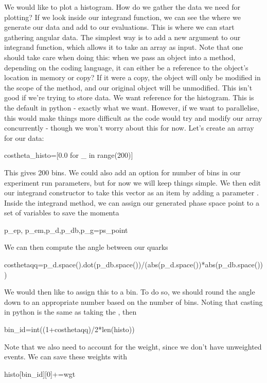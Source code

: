 We would like to plot a histogram. How do we gather the data we need for plotting? If we look inside our integrand function, we can see the where we generate our data and add to our evaluations. This is where we can start gathering angular data. The simplest way is to add a new argument to our integrand function, which allows it to take an array as input. Note that one should take care when doing this: when we pass an object into a method, depending on the coding language, it can either be a reference to the object's location in memory or copy? If it were a copy, the object will only be modified in the scope of the method, and our original object will be unmodified. This isn't good if we're trying to store data. We want reference for the histogram. This is the default in python - exactly what we want. However, if we want to parallelise, this would make things more difficult as the code would try and modify our array concurrently - though we won't worry about this for now. Let's create an array for our data:
\begin{codeenv}
       costheta_histo=[0.0 for _ in range(200)]
\end{codeenv}
This gives 200 bins. We could also add an option for number of  bins in our experiment run parameters, but for now we will keep things simple. We then edit our integrand constructor to take this vector as an item by adding a parameter . Inside the integrand method, we can assign our generated phase space point to a set of variables to save the momenta 
\begin{codeenv}
    p_ep, p_em,p_d,p_db,p_g=ps_point
\end{codeenv}
We can then compute the angle between our quarks
\begin{codeenv}
    costhetaqq=p_d.space().dot(p_db.space())/(abs(p_d.space())*abs(p_db.space()))
\end{codeenv}
We would then like to assign this to a bin. To do so, we should round the angle down to an appropriate number based on the number of bins. Noting that  casting in python is the same as taking the , then
\begin{codeenv}
    bin_id=int((1+costhetaqq)/2*len(histo))
\end{codeenv}
Note that we also need to account for the weight, since we don't have unweighted events. We can save these weights with
\begin{codeenv}
            histo[bin_id][0]+=wgt
\end{codeenv}


